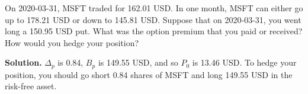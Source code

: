 \noindent On 2020-03-31, MSFT traded for 162.01 USD. In one month, MSFT can either go up to 178.21 USD or down to 145.81 USD. Suppose that on 2020-03-31, you went long a 150.95 USD put. What was the option premium that you paid or received? How would you hedge your position?

\vspace{9pt}

\noindent\textbf{Solution.} $\Delta_{p}$ is 0.84, $B_{p}$ is 149.55 USD, and so $P_{0}$ is 13.46 USD. To hedge your position, you should go short 0.84 shares of MSFT and long 149.55 USD in the risk-free asset.